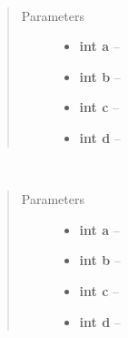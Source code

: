 \documentclass[letterpaper,10pt,english]{sphinxmanual}
\begin{document}
\begin{fulllineitems}
\label{gl:VertexData::addQuadAndIndices__i.i.i.i}~\begin{quote}\begin{description}
\item[{Parameters}] \leavevmode\begin{itemize}
\item {} 
\textbf{int a} -- 

\item {} 
\textbf{int b} -- 

\item {} 
\textbf{int c} -- 

\item {} 
\textbf{int d} -- 

\end{itemize}

\end{description}\end{quote}

\end{fulllineitems}


\begin{fulllineitems}
\label{gl:VertexData::addQuadIndices__i.i.i.i}~\begin{quote}\begin{description}
\item[{Parameters}] \leavevmode\begin{itemize}
\item {} 
\textbf{int a} -- 

\item {} 
\textbf{int b} -- 

\item {} 
\textbf{int c} -- 

\item {} 
\textbf{int d} -- 

\end{itemize}

\end{description}\end{quote}

\end{fulllineitems}
\end{document}
